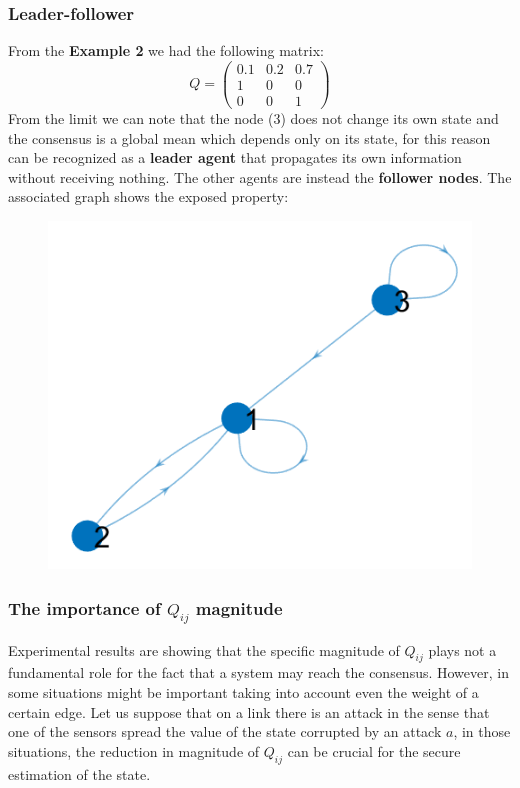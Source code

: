 {\color{blue}\subsubsection{Leader-follower}}
From the \textbf{Example 2} we had the following matrix:
\begin{equation*}
    Q=\begin{pmatrix}
        0.1&0.2&0.7\\1&0&0\\0&0&1
    \end{pmatrix}
\end{equation*}
From the limit we can note that the node (3) does not change its own state and the consensus is a global mean which depends only on its state, for this reason can be recognized as a \textbf{leader agent} that propagates its own information without receiving nothing. The other agents are instead the \textbf{follower nodes}. The associated graph shows the exposed property:
\begin{figure}[h]
    \centering
    \includegraphics[scale=0.7]{images/Leader_follower.png}
\end{figure}

{\color{blue}\subsubsection{The importance of $Q_{ij}$ magnitude}}
Experimental results are showing that the specific magnitude of  $Q_{ij}$ plays not a fundamental role for the fact that a system may reach the consensus. However, in some situations might be important taking into account even the weight of a certain edge. Let us suppose that on a link there is an attack in the sense that one of the sensors spread the value of the state corrupted by an attack $a$, in those situations, the reduction in magnitude of $Q_{ij}$ can be crucial for the secure estimation of the  state.

